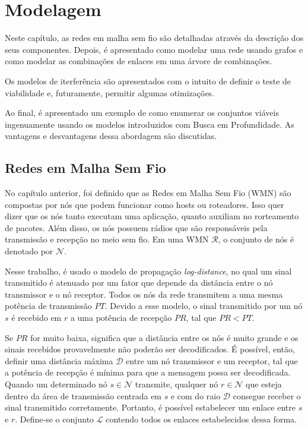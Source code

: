 \chapter{Modelagem}
\label{cap:modelagem}

Neste capítulo, as redes em malha sem fio são detalhadas através da descrição dos seus componentes. Depois, é apresentado como modelar uma rede usando grafos e como modelar as combinações de enlaces em uma árvore de combinações. 

Os modelos de iterferência são apresentados com o intuito de definir o teste de viabilidade e, futuramente, permitir algumas otimizações.

Ao final, é apresentado um exemplo de como enumerar os conjuntos viáveis ingenuamente usando os modelos introduzidos com Busca em Profundidade. As vantagens e desvantagens dessa abordagem são discutidas.

\section{Redes em Malha Sem Fio}
\label{section:mesh}

No capítulo anterior, foi definido que as Redes em Malha Sem Fio (WMN) são compostas por nós que podem funcionar como hosts ou roteadores. Isso quer dizer que os nós tanto executam uma aplicação, quanto auxiliam no rorteamento de pacotes. Além disso, os nós possuem rádios que são responsáveis pela transmissão e recepção no meio sem fio. Em uma WMN $\mathcal{R}$, o conjunto de nós é denotado por $\mathcal{N}$.

Nesse trabalho, é usado o modelo de propagação {\it log-distance}, no qual um sinal transmitido é atenuado por um fator que depende da distância entre o nó transmissor e o nó receptor. Todos os nós da rede transmitem a uma mesma potência de transmissão $PT$. Devido a esse modelo, o sinal transmitido por um nó $s$ é recebido em $r$ a uma potência de recepção $PR$, tal que $PR < PT$.

Se $PR$ for muito baixa, significa que a distância entre os nós é muito grande e os sinais recebidos provavelmente não poderão ser decodificados. É possível, então, definir uma distância máxima $\mathcal{D}$ entre um nó transmissor e um receptor, tal que a potência de recepção é mínima para que a mensagem possa ser decodificada. Quando um determinado nó $s \in \mathcal{N}$ transmite, qualquer nó $r \in \mathcal{N}$ que esteja dentro da área de transmissão centrada em $s$ e com do raio $\mathcal{D}$ consegue receber o sinal transmitido corretamente. Portanto, é possível estabelecer um enlace entre $s$ e $r$. Define-se o conjunto $\mathcal{L}$ contendo todos os enlaces estabelecidos dessa forma. 

